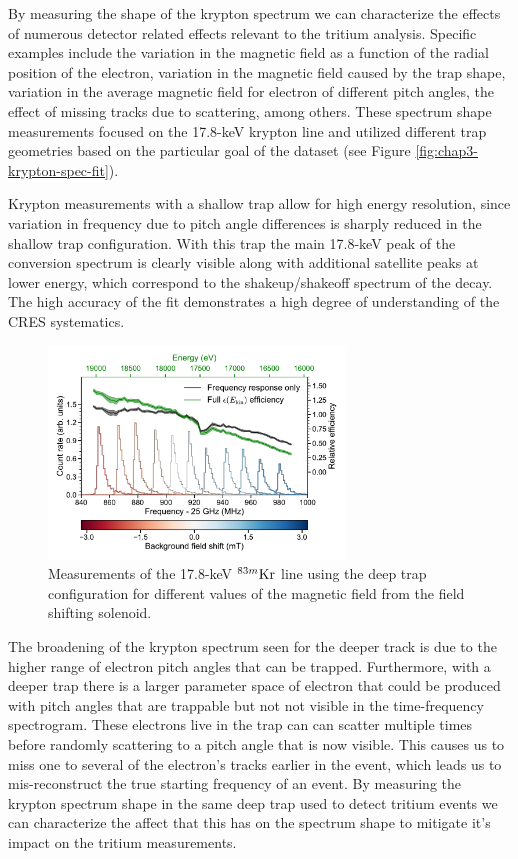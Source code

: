 By measuring the shape of the krypton spectrum we can characterize the effects of numerous detector related effects relevant to the tritium analysis. Specific examples include the variation in the magnetic field as a function of the radial position of the electron, variation in the magnetic field caused by the trap shape, variation in the average magnetic field for electron of different pitch angles, the effect of missing tracks due to scattering, among others. These spectrum shape measurements focused on the 17.8-keV krypton line and utilized different trap geometries based on the particular goal of the dataset (see Figure \ref{fig:chap3-krypton-spec-fit}).

Krypton measurements with a shallow trap allow for high energy resolution, since variation in frequency due to pitch angle differences is sharply reduced in the shallow trap configuration. With this trap the main 17.8-keV peak of the conversion spectrum is clearly visible along with additional satellite peaks at lower energy, which correspond to the shakeup/shakeoff spectrum of the decay. The high accuracy of the fit demonstrates a high degree of understanding of the CRES systematics.

\begin{figure}[htbp]
    \centering
    \includegraphics[width=0.7\textwidth]{figs/Chapter-3/fss_for_prl_plot.pdf}
    \caption{Measurements of the 17.8-keV $^{83m}\rm{Kr}$ line using the deep trap configuration for different values of the magnetic field from the field shifting solenoid.}
    \label{fig:chap3-fss-plot}
\end{figure}

The broadening of the krypton spectrum seen for the deeper track is due to the higher range of electron pitch angles that can be trapped. Furthermore, with a deeper trap there is a larger parameter space of electron that could be produced with pitch angles that are trappable but not not visible in the time-frequency spectrogram. These electrons live in the trap can can scatter multiple times before randomly scattering to a pitch angle that is now visible. This causes us to miss one to several of the electron's tracks earlier in the event, which leads us to mis-reconstruct the true starting frequency of an event. By measuring the krypton spectrum shape in the same deep trap used to detect tritium events we can characterize the affect that this has on the spectrum shape to mitigate it's impact on the tritium measurements.

